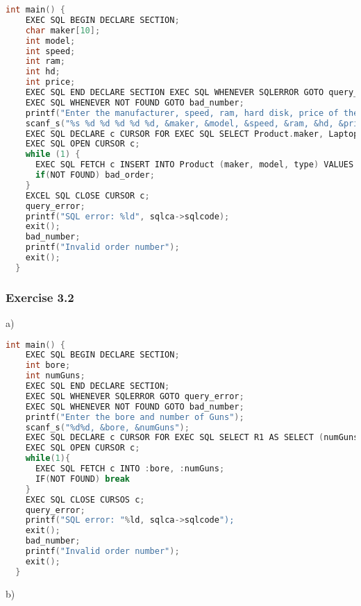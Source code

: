 \documentclass[../../main.tex]{subfiles}
\begin{document}
\begin{lstlisting}[language=c]
  int main() {
    EXEC SQL BEGIN DECLARE SECTION;
    char maker[10];
    int model;
    int speed;
    int ram;
    int hd;
    int price;
    EXEC SQL END DECLARE SECTION EXEC SQL WHENEVER SQLERROR GOTO query_error;
    EXEC SQL WHENEVER NOT FOUND GOTO bad_number;
    printf("Enter the manufacturer, speed, ram, hard disk, price of the PC: ");
    scanf_s("%s %d %d %d %d %d, &maker, &model, &speed, &ram, &hd, &price");
    EXEC SQL DECLARE c CURSOR FOR EXEC SQL SELECT Product.maker, Laptop.model, Laptop.speed, Laptop.ram, Laptop.hd, Laptop.price FROM Product, PC, Laptop WHERE PC.model=model;
    EXEC SQL OPEN CURSOR c;
    while (1) {
      EXEC SQL FETCH c INSERT INTO Product (maker, model, type) VALUES (:maker, :model, :") INSERT INTO PC (model, speed, ram, hd, screen, price) VALUES (:model, :speed, :ram, :hd:", :price);
      if(NOT FOUND) bad_order;
    }
    EXCEL SQL CLOSE CURSOR c;
    query_error;
    printf("SQL error: %ld", sqlca->sqlcode);
    exit();
    bad_number;
    printf("Invalid order number");
    exit();
  }
\end{lstlisting}

\subsubsection*{Exercise 3.2}

a)

\begin{lstlisting}[language=c]
  int main() {
    EXEC SQL BEGIN DECLARE SECTION;
    int bore;
    int numGuns;
    EXEC SQL END DECLARE SECTION;
    EXEC SQL WHENEVER SQLERROR GOTO query_error;
    EXEC SQL WHENEVER NOT FOUND GOTO bad_number;
    printf("Enter the bore and number of Guns");
    scanf_s("%d%d, &bore, &numGuns");
    EXEC SQL DECLARE c CURSOR FOR EXEC SQL SELECT R1 AS SELECT (numGuns*bore^3) AS firepower FROM Classes, R2 AS SELECT min(firepower) minimum FROM R1, SELECT Classes FROM R1 WHERE firepower = (SELECT minimum FROM R2);
    EXEC SQL OPEN CURSOR c;
    while(1){
      EXEC SQL FETCH c INTO :bore, :numGuns;
      IF(NOT FOUND) break
    }
    EXEC SQL CLOSE CURSOS c;
    query_error;
    printf("SQL error: "%ld, sqlca->sqlcode");
    exit();
    bad_number;
    printf("Invalid order number");
    exit();
  }
\end{lstlisting}

b)
\end{document}
